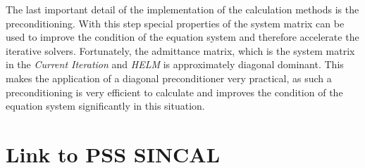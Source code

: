 The last important detail of the implementation of the calculation methods is the preconditioning. With this step special properties of the system matrix can be used to improve the condition of the equation system and therefore accelerate the iterative solvers. Fortunately, the admittance matrix, which is the system matrix in the \emph{Current Iteration} and \emph{HELM} is approximately diagonal dominant. This makes the application of a diagonal preconditioner very practical, as such a preconditioning is very efficient to calculate and improves the condition of the equation system significantly in this situation.

\section{Link to PSS SINCAL}
\label{sec:link_sincal}